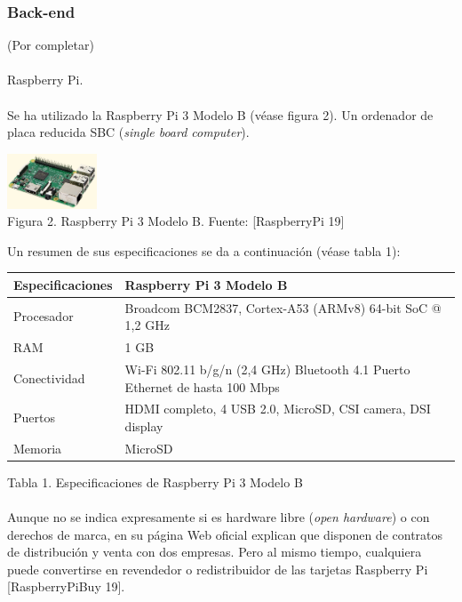 \documentclass[9pt,oneside]{amsart}
\begin{document}
\begin{multicols}{2}
\subsubsection{Back-end} \label{ch:back-end}
(Por completar)
\\
\\
Raspberry Pi.
\\
\\
Se ha utilizado la Raspberry Pi 3 Modelo B (véase figura 2). Un ordenador de placa reducida SBC (\textit{single board computer}).
\begin{center}
  \includegraphics[keepaspectratio, width=0.2\textwidth]{images/rpi3modelb-sourceamazon.eps}
\\
Figura 2. Raspberry Pi 3 Modelo B. Fuente: [RaspberryPi 19]
\\
\end{center}
Un resumen de sus especificaciones se da a continuación (véase tabla 1):
\begin{center}
\begin{tabular}{ | m{} | m{} | }
 \hline
 Especificaciones & Raspberry Pi 3 Modelo B \\
 \hline
 Procesador & Broadcom BCM2837, Cortex-A53 (ARMv8) 64-bit SoC @ 1,2 GHz \\
\hline
 RAM & 1 GB \\
\hline
 Conectividad & Wi-Fi 802.11 b/g/n (2,4 GHz) Bluetooth 4.1 Puerto Ethernet de hasta 100 Mbps \\
\hline
 Puertos & HDMI completo, 4 USB 2.0, MicroSD, CSI camera, DSI display \\
\hline
 Memoria & MicroSD \\
\hline
\end{tabular}
\newline
\end{center}
Tabla 1. Especificaciones de Raspberry Pi 3 Modelo B
\\
\\
Aunque no se indica expresamente si es hardware libre (\textit{open hardware}) o con derechos de marca, en su página Web oficial explican que disponen de contratos de distribución y venta con dos empresas. Pero al mismo tiempo, cualquiera puede convertirse en revendedor o redistribuidor de las tarjetas Raspberry Pi [RaspberryPiBuy 19].

\end{multicols}
\end{document}
